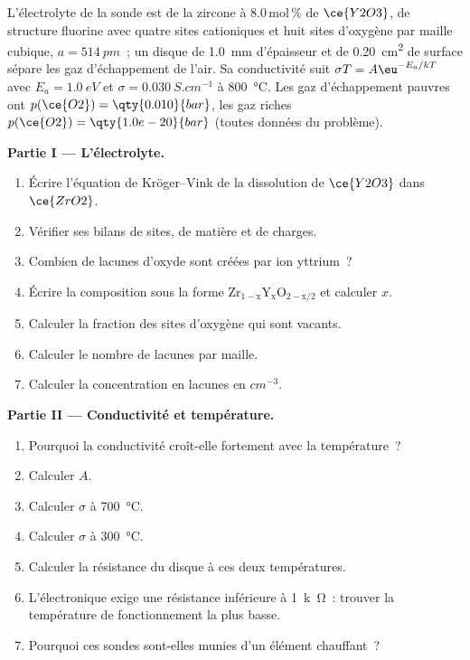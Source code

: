 \begin{problem}
\label{pb:b3:solid-state:1}
L'électrolyte de la sonde est de la zircone à 8.0\,mol\,\% de $\ce{Y2O3}$, de structure fluorine
avec quatre sites cationiques et huit sites d'oxygène par maille cubique, $a = \qty{514}{pm}$~; un disque
de \qty{1.0}{mm} d'épaisseur et de \qty{0.20}{cm^2} de surface sépare les
gaz d'échappement de l'air. Sa
conductivité suit $\sigma T = A\eu^{-E_a/kT}$ avec $E_a = \qty{1.0}{eV}$ et $\sigma = \qty{0.030}{S.cm^{-1}}$ à \qty{800}{\celsius}. Les gaz
d'échappement pauvres ont $p(\ce{O2}) = \qty{0.010}{bar}$, les gaz riches $p(\ce{O2}) = \qty{1.0e-20}{bar}$ (toutes données du problème).

\medskip\noindent\textbf{Partie I --- L'électrolyte.}
\begin{enumerate}
  \item Écrire l'équation de Kröger--Vink de la dissolution de $\ce{Y2O3}$ dans $\ce{ZrO2}$.
  \item Vérifier ses bilans de sites, de matière et de charges.
  \item Combien de lacunes d'oxyde sont créées par ion yttrium~?
  \item Écrire la composition sous la forme $\mathrm{Zr_{1-x}Y_xO_{2-x/2}}$ et calculer $x$.
  \item Calculer la fraction des sites d'oxygène qui sont vacants.
  \item Calculer le nombre de lacunes par maille.
  \item Calculer la concentration en lacunes en $\unit{cm^{-3}}$.
\end{enumerate}

\medskip\noindent\textbf{Partie II --- Conductivité et température.}
\begin{enumerate}[resume]
  \item Pourquoi la conductivité croît-elle fortement avec la température~?
  \item Calculer $A$.
  \item Calculer $\sigma$ à \qty{700}{\celsius}.
  \item Calculer $\sigma$ à \qty{300}{\celsius}.
  \item Calculer la résistance du disque à ces deux températures.
  \item L'électronique exige une résistance inférieure à \qty{1}{k\ohm}~:
        trouver la température de fonctionnement la plus basse.
  \item Pourquoi ces sondes sont-elles munies d'un élément chauffant~?
\end{enumerate}


\end{problem}
